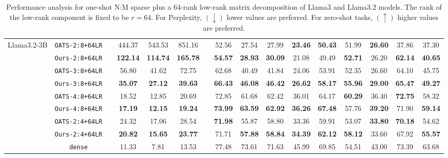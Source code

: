 \begin{table}[h!]
{\begin{tabular}{ccc@{\hskip 8pt}cccc@{\hskip 8pt}ccccccccc}
\midrule
\multirow{9.5}{*}{Llama3.2-3B} 
&\texttt{OATS-2:8+64LR}       && 444.37 & 543.53 & 851.16 && 52.56 & 27.54 & 27.99 & \textbf{23.46} & \textbf{50.43} & 51.99 & \textbf{26.60} & 37.86 & 37.30 \\
&\texttt{Ours-2:8+64LR}       && \textbf{122.14} & \textbf{114.74} & \textbf{165.78} && \textbf{54.57} & \textbf{28.93} & \textbf{30.09} & 21.08 & 49.49 & \textbf{52.71} & 26.20 & \textbf{62.14} & \textbf{40.65} \\
\cmidrule(rl){2-2}
&\texttt{OATS-3:8+64LR}       && 56.80 & 41.62 & 72.75 && 62.68 & 40.49 & 41.84 & 24.06 & 53.91 & 52.35 & 26.60 & 64.10 & 45.75 \\
&\texttt{Ours-3:8+64LR}       && \textbf{35.07} & \textbf{27.12} & \textbf{39.63} && \textbf{66.43} & \textbf{46.08} & \textbf{46.42} & \textbf{26.62} & \textbf{58.17} & \textbf{55.96} & \textbf{29.00} & \textbf{65.47} & \textbf{49.27} \\
\cmidrule(rl){2-2}
&\texttt{OATS-4:8+64LR}       && 18.52 & 12.85 & 20.69 && 72.85 & 61.68 & 62.42 & 36.01 & 64.17 & \textbf{60.29} & 36.40 & \textbf{72.75} & 58.32 \\
&\texttt{Ours-4:8+64LR}       && \textbf{17.19} & \textbf{12.15} & \textbf{19.24} && \textbf{73.99} & \textbf{63.59} & \textbf{62.92} & \textbf{36.26} & \textbf{67.48} & 57.76 & \textbf{39.20} & 71.90 & \textbf{59.14} \\
\cmidrule(rl){2-2}
&\texttt{OATS-2:4+64LR}       && 24.32 & 17.06 & 28.54 && \textbf{71.98} & 55.87 & 58.80 & 33.36 & 59.91 & 53.07 & \textbf{33.80} & \textbf{70.18} & 54.62 \\
&\texttt{Ours-2:4+64LR}       && \textbf{20.82} & \textbf{15.65} & \textbf{23.77} && 71.71 & \textbf{57.88} & \textbf{58.84} & \textbf{34.39} & \textbf{62.12} & \textbf{58.12} & 33.60 & 67.92 & \textbf{55.57} \\
\cmidrule(rl){2-2}
&\texttt{dense}               && 11.33 & 7.81 & 13.53 && 77.48 & 73.61 & 71.63 & 45.99 & 69.85 & 54.51 & 43.00 & 73.39 & 63.68 \\

\bottomrule
\end{tabular}
}
\vspace{3pt}
\caption{Performance analysis for one-shot N:M sparse plus a 64-rank low-rank matrix decomposition of Llama3 and Llama3.2 models. The rank of the low-rank component is fixed to be $r=64$. For Perplexity, $(\downarrow)$ lower values are preferred. For zero-shot tasks, $(\uparrow)$ higher values are preferred.}
\label{tab:slr-fixed-rank}
\end{table}
